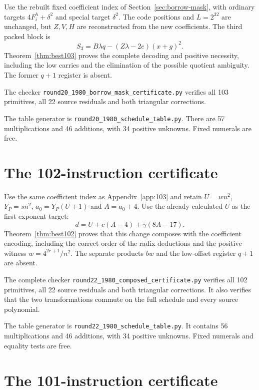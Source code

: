 \documentclass[11pt,letterpaper]{article}
\theoremstyle{definition}
\theoremstyle{remark}
\numberwithin{equation}{section}
\newcommand{\file}[1]{\texttt{#1}}
\begin{document}
Use the rebuilt fixed coefficient index of Section~\ref{sec:borrow-mask},
with ordinary targets $4F_i^h+\delta^2$ and special target $\delta^2$.
The code positions and $L=2^{32}$ are unchanged, but $Z,V,H$ are
reconstructed from the new coefficients. The third packed block is
\[
 S_3=B\lambda q-(Z\lambda-2e)(x+g)^2.
\]
Theorem~\ref{thm:best103} proves the complete decoding and positive
necessity, including the low carries and the elimination of the
possible quotient ambiguity. The former $q+1$ register is absent.

The checker \file{round20\_1980\_borrow\_mask\_certificate.py}
verifies all 103 primitives, all 22 source residuals and both triangular
corrections.

The table generator is \file{round20\_1980\_schedule\_table.py}.
There are 57 multiplications
and 46 additions, with 34 positive unknowns. Fixed numerals are free.

\small


\clearpage\normalsize
\section{The 102-instruction certificate}\label{app:102}

Use the same coefficient index as Appendix~\ref{app:103} and retain
$U=wn^2$, $Y_P=sn^2$, $a_0=Y_P(U+1)$ and $A=a_0+4$.
Use the already calculated $U$ as the first exponent target:
\[
 d=U+c(A-4)+\gamma(8A-17).
\]
Theorem~\ref{thm:best102} proves that this change composes with the
coefficient encoding, including the correct order of the radix
deductions and the positive witness $w=4^{2r+1}/n^2$.
The separate products $bw$ and the low-offset register $q+1$ are absent.

The complete checker \file{round22\_1980\_composed\_certificate.py}
verifies all 102 primitives, all 22 source residuals and both triangular
corrections. It also verifies that the two transformations commute
on the full schedule and every source polynomial.

The table generator is \file{round22\_1980\_schedule\_table.py}.
It contains
56 multiplications and 46 additions, with 34 positive unknowns.
Fixed numerals and equality tests are free.

\small


\clearpage\normalsize
\section{The 101-instruction certificate}\label{app:101}
\end{document}
